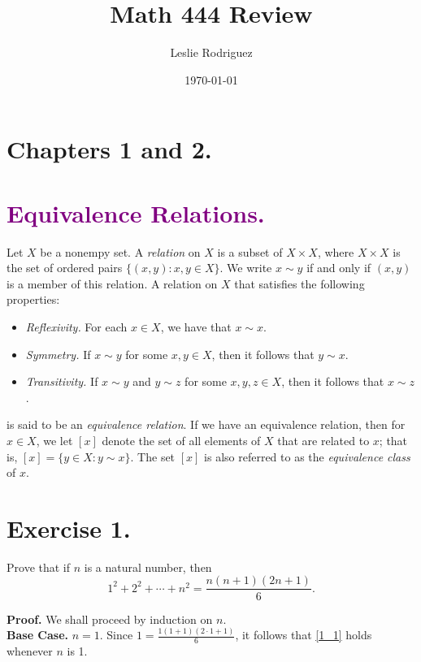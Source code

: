 \documentclass{article}
\title{Math 444 Review}
\author{Leslie Rodriguez}
\date{\today}
\newcommand{\D}{\displaystyle}
\begin{document}
   \maketitle

   \section*{Chapters 1 and 2.}

   \section*{\textcolor{purple}{Equivalence Relations.}} Let $X$ be a nonempy 
   set. A \textit{relation} on $X$ is a subset of $X \times X$, where
   $X \times X$ is the set of ordered pairs $\{(x, y) : x, y \in X\}$. We write 
   $x \sim y$ if and only if $(x, y)$ is a member of this relation. A relation
   on $X$ that satisfies the following properties:
   \begin{itemize}
      \item \textit{Reflexivity.} For each $x \in X$, we have that $x \sim x$.
      \item \textit{Symmetry.} If $x \sim y$ for some $x, y \in X$, then it
            follows that $y \sim x$.
      \item \textit{Transitivity.} If $x \sim y$ and $y \sim z$ for some
            $x, y, z \in X$, then it follows that $x \sim z$.
   \end{itemize}
   is said to be an \textit{equivalence relation}. If we have an equivalence
   relation, then for $x \in X$, we let $[x]$ denote the set of all elements of
   $X$ that are related to $x$; that is, $[x] = \{y \in X: y \sim x\}$. The set
   $[x]$ is also referred to as the \textit{equivalence class} of $x$.

   \section*{Exercise 1.} Prove that if $n$ is a natural number, then
   \begin{equation}
      1^2 + 2^2 + \cdots + n^2 = \D\frac{n(n+1)(2n+1)}{6}. \label{1_1}
   \end{equation}

   \textbf{Proof.} We shall proceed by induction on $n$. \\

   \textbf{Base Case.} $n = 1$. Since $1 = \D\frac{1(1 + 1)(2\cdot1+1)}{6}$, it 
   follows that \eqref{1_1} holds whenever $n$ is 1. \\
\end{document}
